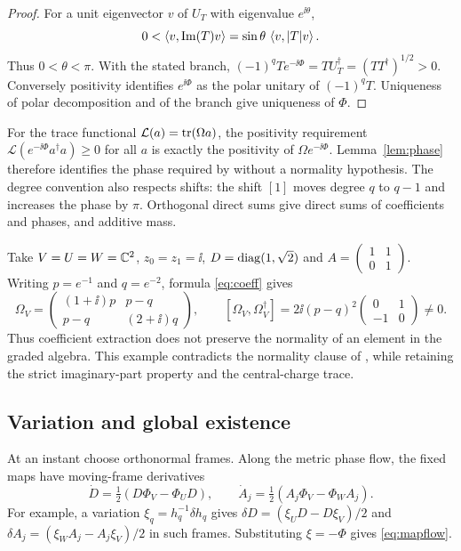\begin{proof}
For a unit eigenvector $v$ of $U_T$ with eigenvalue $e^{\ii\theta}$,
\[
 0<\left\langle v,\operatorname{Im}(T)v\right\rangle
   =\sin\theta\,\left\langle v,|T|v\right\rangle.
\]
Thus $0<\theta<\pi$. With the stated branch,
$(-1)^qT e^{-\ii\Phi}=TU_T^\dagger=(TT^\dagger)^{1/2}>0$.
Conversely positivity identifies $e^{\ii\Phi}$ as the polar unitary
of $(-1)^qT$. Uniqueness of polar decomposition and of the branch
give uniqueness of $\Phi$.
\end{proof}

For the trace functional $\mathcal L(a)=\operatorname{tr}(\Omega a)$,
the positivity requirement
$\mathcal L(e^{-\ii\Phi}a^\dagger a)\geq0$ for all $a$
is exactly the positivity of $\Omega e^{-\ii\Phi}$.
Lemma~\ref{lem:phase} therefore identifies the phase required by
\cite[\S4.2]{hkkp26} without a normality hypothesis.
The degree convention also respects shifts: the shift $[1]$ moves
degree $q$ to $q-1$ and increases the phase by $\pi$.
Orthogonal direct sums give direct sums of coefficients and phases,
and additive mass.

\begin{example}\label{ex:nonnormal}
Take $V=U=W=\mathbb C^2$, $z_0=z_1=\ii$,
$D=\operatorname{diag}(1,\sqrt2)$ and
$A=\left(\begin{smallmatrix}1&1\\0&1\end{smallmatrix}\right)$.
Writing $p=e^{-1}$ and $q=e^{-2}$, formula \eqref{eq:coeff} gives
\[
 \Omega_V=
 \begin{pmatrix}(1+\ii)p&p-q\\p-q&(2+\ii)q\end{pmatrix},\qquad
 [\Omega_V,\Omega_V^\dagger]
 =2\ii(p-q)^2\begin{pmatrix}0&1\\-1&0\end{pmatrix}\ne0.
\]
Thus coefficient extraction does not preserve the normality of an
element in the graded algebra. This example contradicts the
normality clause of \cite[Lemma~5.16]{hkkp26}, while retaining the
strict imaginary-part property and the central-charge trace.
\end{example}

\subsection{Variation and global existence}
At an instant choose orthonormal frames. Along the metric phase flow,
the fixed maps have moving-frame derivatives
\begin{equation}\label{eq:mapflow}
 \dot D=\tfrac12(D\Phi_V-\Phi_UD),\qquad
 \dot A_j=\tfrac12(A_j\Phi_V-\Phi_WA_j).
\end{equation}
For example, a variation $\xi_q=h_q^{-1}\delta h_q$ gives
$\delta D=(\xi_UD-D\xi_V)/2$ and
$\delta A_j=(\xi_WA_j-A_j\xi_V)/2$ in such frames.
Substituting $\xi=-\Phi$ gives \eqref{eq:mapflow}.

